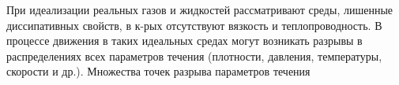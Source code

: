 \documentclass[10pt]{article}
\begin{document}
При идеализации реальных газов и жидкостей рассматривают среды, лишенные диссипативных свойств, в к-рых отсутствуют вязкость и теплопроводность. В процессе движения в таких идеальных средах могут возникать разрывы в распределениях всех параметров течения (плотности, давления, температуры, скорости и др.). Множества точек разрыва параметров течения
\end{document}
